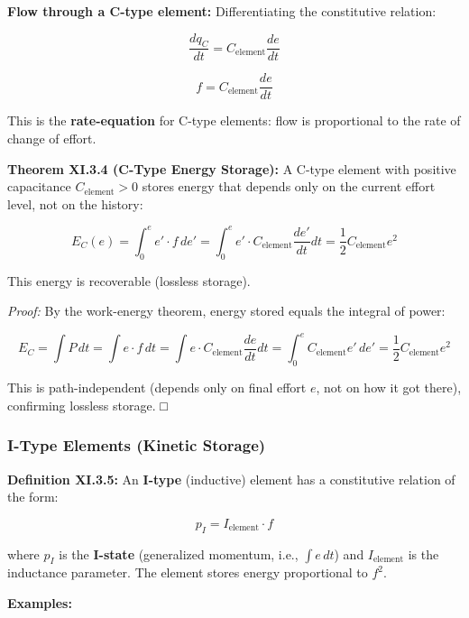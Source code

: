\documentclass[
]{article}
\begin{document}
\textbf{Flow through a C-type element:} Differentiating the constitutive
relation:

\[\frac{dq_C}{dt} = C_{\text{element}} \frac{de}{dt}\]

\[f = C_{\text{element}} \frac{de}{dt}\]

This is the \textbf{rate-equation} for C-type elements: flow is
proportional to the rate of change of effort.

\textbf{Theorem XI.3.4 (C-Type Energy Storage):} A C-type element with
positive capacitance \(C_{\text{element}} > 0\) stores energy that
depends only on the current effort level, not on the history:

\[E_C(e) = \int_0^e e' \cdot f\,de' = \int_0^e e' \cdot C_{\text{element}} \frac{de'}{dt} dt = \frac{1}{2}C_{\text{element}} e^2\]

This energy is recoverable (lossless storage).

\emph{Proof:} By the work-energy theorem, energy stored equals the
integral of power:

\[E_C = \int P\,dt = \int e \cdot f\,dt = \int e \cdot C_{\text{element}} \frac{de}{dt} dt = \int_0^e C_{\text{element}} e'\,de' = \frac{1}{2}C_{\text{element}} e^2\]

This is path-independent (depends only on final effort \(e\), not on how
it got there), confirming lossless storage. □

\subsubsection{I-Type Elements (Kinetic
Storage)}\label{i-type-elements-kinetic-storage}

\textbf{Definition XI.3.5:} An \textbf{I-type} (inductive) element has a
constitutive relation of the form:

\[p_I = I_{\text{element}} \cdot f\]

where \(p_I\) is the \textbf{I-state} (generalized momentum, i.e.,
\(\int e\,dt\)) and \(I_{\text{element}}\) is the inductance parameter.
The element stores energy proportional to \(f^2\).

\textbf{Examples:}
\end{document}
